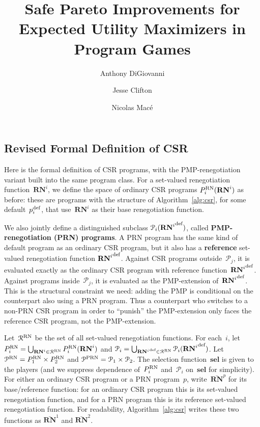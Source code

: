 \documentclass[sigconf]{aamas}
\title[AAMAS-2025 Formatting Instructions]{Safe Pareto Improvements
for \\
Expected Utility
Maximizers in Program Games}
\author{Anthony DiGiovanni}
\affiliation{
  \institution{Center on Long-Term Risk}
  \city{London}
  \country{United Kingdom}}
\author{Jesse Clifton}
\affiliation{
  \institution{Center on Long-Term Risk}
  \city{London}
  \country{United Kingdom}}
\author{Nicolas Macé}
\affiliation{
  \institution{Center on Long-Term Risk}
  \city{London}
  \country{United Kingdom}}
\newcommand{\allprogreneg}{\allprog^{\text{RN}}}
\newcommand{\prnsup}{\textnormal{PRN}}
\newcommand{\prnspacei}{\mathcal{P}_i}
\newcommand{\prnspacej}{\mathcal{P}_j}
\newcommand{\prnspaceone}{\mathcal{P}_1}
\newcommand{\prnspacetwo}{\mathcal{P}_2}
\newcommand{\allprogprn}{\allprog^{\prnsup}}
\newcommand{\defrenegi}{{\renegi}^{\textnormal{def}}}
\newcommand{\selection}{sel}%
\newcommand{\renegb}{\mathbf{\selection}}
\theoremstyle{definition}
\newcommand{\svsup}{\textnormal{RN}}
\newcommand{\csrsup}{\textnormal{RN}}
\newcommand{\defprogi}{\progi^{\textnormal{def}}}
\newcommand{\termemph}[1]{\textbf{#1}}%
\newcommand{\fsspaceireni}{\fsspacei(\renegi)}%
\newcommand{\fullfsspacei}{\fsspacei}%
\newcommand{\fullfsspaceone}{\fsspaceone}%
\newcommand{\fullfsspacetwo}{\fsspacetwo}%
\newcommand{\fullsvspace}{\mathcal{R}^{\svsup}}
\newcommand{\renegi}{\reneg^{i}}
\newcommand{\selfunction}[0]{selection}%
\newcommand{\programspace}{P}
\newcommand{\progi}{\prog_i}
\newcommand{\allprog}{\mathcal{P}}
\newcommand{\fsspaceone}{\programspace_1^{\csrsup}}
\newcommand{\fsspacetwo}{\programspace_2^{\csrsup}}
\newcommand{\fsspacei}{\programspace_i^{\csrsup}}
\newcommand{\reneg}{\mathbf{RN}}
\newcommand{\prog}{p}
\theoremstyle{definition}
\begin{document}
\pagestyle{fancy}
\fancyhead{}


\subsection{Revised Formal Definition of
CSR}
\label{sec:sub:components}

Here 
is the formal definition of CSR
programs, with the PMP-renegotiation
variant built into the same program class.
For a
set-valued
renegotiation
function~$\renegi$,
we define
the space of ordinary
CSR
programs
$\fsspaceireni$
as before: these are programs
with the structure
of
Algorithm~\ref{alg:csr},
for some default~$\defprogi$,
that use~$\renegi$ as their base
renegotiation function.

We also jointly define a distinguished subclass
$\prnspacei(\defrenegi)$,
called
\termemph{PMP-renegotiation (PRN) programs}.
A PRN program has the same kind of default
program as an ordinary CSR program, but it also has
a \termemph{reference} set-valued renegotiation function
$\defrenegi$.
Against CSR programs outside~$\prnspacej$,
it is evaluated exactly as the ordinary CSR program
with reference function~$\defrenegi$.
Against programs inside~$\prnspacej$,
it is evaluated as the PMP-extension of~$\defrenegi$.
This is the structural constraint we need:
adding the PMP is conditional on the counterpart also using a PRN program.
Thus a counterpart who switches to a non-PRN CSR program in order to
``punish'' the PMP-extension only faces the reference CSR program,
not the PMP-extension.

Let~$\fullsvspace$ be the set of all
set-valued renegotiation 
functions.
For each~$i$, let
$\fullfsspacei = \bigcup_{\renegi \in \fullsvspace} \fsspaceireni$
and
$\prnspacei = \bigcup_{\defrenegi \in \fullsvspace}\prnspacei(\defrenegi)$.
Let
$\allprogreneg = \fullfsspaceone \times \fullfsspacetwo$
and
$\allprogprn = \prnspaceone \times \prnspacetwo$.
The \selfunction{} function~$\renegb$
is given to
the players
(and we suppress dependence of~$\fullfsspacei$ and~$\prnspacei$ on~$\renegb$ for simplicity).
For either an ordinary CSR program or a PRN program~$p$,
write~$\bar{\reneg}^{p}$ for its base/reference function:
for an ordinary CSR program this is its set-valued renegotiation function,
and for a PRN program this is its reference set-valued renegotiation function.
For readability, Algorithm~\ref{alg:csr} writes these two functions as $\bar{\reneg}^{1}$ and $\bar{\reneg}^{2}$.
\end{document}

